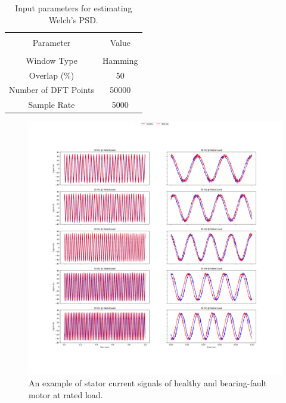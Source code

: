\begin{table}[h]
	{\setlength{\tabcolsep}{12pt}
		\caption{Input parameters for estimating Welch's PSD.}
		\begin{center}
			\vspace{-6mm}
			\begin{tabular}{cc}
				\hline \\[-2.45ex] \hline \\[-2.1ex]
				Parameter & Value  \\
				\hline \\[-1.8ex]
				Window Type & Hamming    \\
				Overlap (\%) & 50 \\
				Number of DFT Points & 50000  \\
				Sample Rate & 5000    \\
				\hline
			\end{tabular}
			\vspace{-6mm}
		\end{center}
		\label{Table3.4}}
\end{table}
\pagebreak
\begin{figure}[h]
	\centering
	\includegraphics[width=0.8\paperwidth,keepaspectratio=true]{./fig/bearing_100.png}
	\caption{An example of stator current signals of healthy and bearing-fault motor at rated load.}	
	\label{bearing100}
\end{figure}

